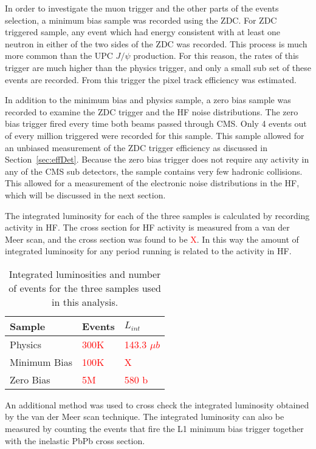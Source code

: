       In order to investigate the muon trigger and the other parts of the events 
        selection, a minimum bias sample was recorded using the ZDC. 
      For ZDC triggered sample, any event which had energy consistent with at 
        least one neutron in either of the two sides of the ZDC was recorded.
      This process is much more common than the UPC $J/\psi$ production.
      For this reason, the rates of this trigger are much higher than the physics
        trigger, and only a small sub set of these events are recorded.
      From this trigger the pixel track efficiency was estimated. 
  
      In addition to the minimum bias and physics sample, a zero bias sample was 
        recorded to examine the ZDC trigger and the HF noise distributions. 
      The zero bias trigger fired every time both beams passed through CMS. 
      Only 4 events out of every million triggered were recorded for this sample. 
      This sample allowed for an unbiased measurement of the ZDC trigger 
      efficiency as discussed in Section~\ref{sec:effDet}. 
      Because the zero bias trigger does not require any activity in any of the
        CMS sub detectors, the sample contains very few hadronic collisions. 
      This allowed for a measurement of the electronic noise distributions in
        the HF, which will be discussed in the next section.
  
      The integrated luminosity for each of the three samples is calculated
        by recording activity in HF. 
      The cross section for HF activity is measured from a van der Meer scan, and
        the cross section was found to be \textcolor{red}{X}.
      In this way the amount of integrated luminosity for any period running is
        related to the activity in HF. 
      \begin{table}
  	    \centering
  	    \begin{tabular}{|l|l|l|}
  	      \hline Sample & Events & $L_{int}$ \\ \hline \hline
  	      Physics & \textcolor{red}{300K} & \textcolor{red}{143.3 
  	        $\mu$$b$} \\ \hline
  	      Minimum Bias & \textcolor{red}{100K} & \textcolor{red}{X} \\ \hline
  	      Zero Bias & \textcolor{red}{5M} & \textcolor{red}{580 b} \\ \hline \hline
  	    \end{tabular}
  	    \caption{Integrated luminosities and number of events for the three
  	      samples used in this analysis.}
  	    \label{tab:sampleLumiNevt}
      \end{table}
      An additional method was used to cross check the integrated luminosity 
        obtained by the van der Meer scan technique.
      The integrated luminosity can also be measured by counting the events that
        fire the L1 minimum bias trigger together with the inelastic PbPb cross 
        section. 
  
